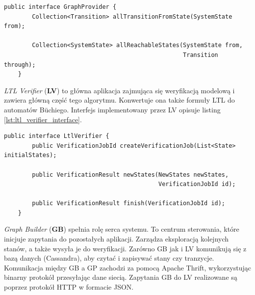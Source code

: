 \begin{lstlisting}[caption={Interfejs implementowany przez GP.},captionpos=b,label={lst:graph_provider_interface}]
    public interface GraphProvider {
        Collection<Transition> allTransitionFromState(SystemState from);

        Collection<SystemState> allReachableStates(SystemState from,
                                                   Transition through);
    }
\end{lstlisting}

\textit{LTL Verifier} (\textbf{LV}) to główna aplikacja zajmująca się weryfikacją modelową i zawiera główną część tego algorytmu.
Konwertuje ona także formuły LTL do automatów Büchiego.
Interfejs implementowany przez LV opisuje listing \ref{lst:ltl_verifier_interface}.

\begin{lstlisting}[caption={Interfejs implementowany przez LV.},captionpos=b,label={lst:ltl_verifier_interface}]
    public interface LtlVerifier {
        public VerificationJobId createVerificationJob(List<State> initialStates);

        public VerificationResult newStates(NewStates newStates,
                                            VerificationJobId id);

        public VerificationResult finish(VerificationJobId id);
    }
\end{lstlisting}

\textit{Graph Builder} (\textbf{GB}) spełnia rolę serca systemu.
To centrum sterowania, które inicjuje zapytania do pozostałych aplikacji.
Zarządza eksploracją kolejnych stanów, a także wysyła je do weryfikacji.
Zarówno GB jak i LV komunikują się z bazą danych (Cassandra), aby czytać i zapisywać stany czy tranzycje.
Komunikacja między GB a GP zachodzi za pomocą Apache Thrift, wykorzystując binarny protokół przesyłając dane siecią.
Zapytania GB do LV realizowane są poprzez protokół HTTP w formacie JSON.
